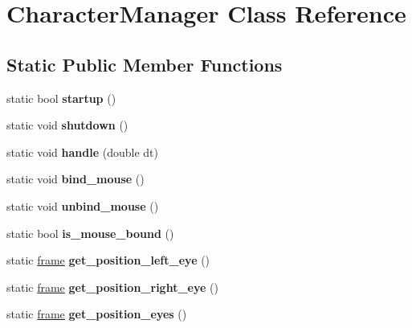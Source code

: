 \hypertarget{class_character_manager}{}\section{Character\+Manager Class Reference}
\label{class_character_manager}
\subsection*{Static Public Member Functions}
\begin{DoxyCompactItemize}
\item 
\hypertarget{class_character_manager_ac848d3a084b85eeccbcfa7aa7664dbbd}{}static bool {\bfseries startup} ()\label{class_character_manager_ac848d3a084b85eeccbcfa7aa7664dbbd}

\item 
\hypertarget{class_character_manager_af8e374364891f21a504c80a1f0b9d4c9}{}static void {\bfseries shutdown} ()\label{class_character_manager_af8e374364891f21a504c80a1f0b9d4c9}

\item 
\hypertarget{class_character_manager_a906dc7f1841d9da41ce7e24d6012b0df}{}static void {\bfseries handle} (double dt)\label{class_character_manager_a906dc7f1841d9da41ce7e24d6012b0df}

\item 
\hypertarget{class_character_manager_aba39c4309699ea6947d89780f64b0236}{}static void {\bfseries bind\+\_\+mouse} ()\label{class_character_manager_aba39c4309699ea6947d89780f64b0236}

\item 
\hypertarget{class_character_manager_ad5592d222ed7be026ac290b4d9269b17}{}static void {\bfseries unbind\+\_\+mouse} ()\label{class_character_manager_ad5592d222ed7be026ac290b4d9269b17}

\item 
\hypertarget{class_character_manager_ab8b333517c8e44b23a01f62c35008c22}{}static bool {\bfseries is\+\_\+mouse\+\_\+bound} ()\label{class_character_manager_ab8b333517c8e44b23a01f62c35008c22}

\item 
\hypertarget{class_character_manager_a4dae06e486d806d966be90a5d929d1cf}{}static \hyperlink{structframe}{frame} {\bfseries get\+\_\+position\+\_\+left\+\_\+eye} ()\label{class_character_manager_a4dae06e486d806d966be90a5d929d1cf}

\item 
\hypertarget{class_character_manager_aea9a7a23ca52b3cc1785d5111b0a5aa0}{}static \hyperlink{structframe}{frame} {\bfseries get\+\_\+position\+\_\+right\+\_\+eye} ()\label{class_character_manager_aea9a7a23ca52b3cc1785d5111b0a5aa0}

\item 
\hypertarget{class_character_manager_ac425b81bdb0fd629287527a92e01b9e1}{}static \hyperlink{structframe}{frame} {\bfseries get\+\_\+position\+\_\+eyes} ()\label{class_character_manager_ac425b81bdb0fd629287527a92e01b9e1}

\end{DoxyCompactItemize}
